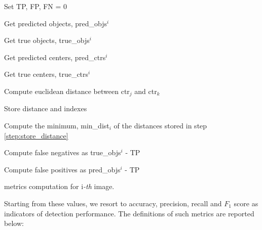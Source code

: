 \begin{algorithm}%
    \DontPrintSemicolon
    
    Set TP, FP, FN = 0
    
    Get predicted objects, pred\_objs$^i$
    
    Get true objects, true\_objs$^i$
    
    Get predicted centers, pred\_ctrs$^i$
    
    Get true centers, true\_ctrs$^i$
    
        {
            {
            
             Compute euclidean distance between ctr$_j$ and ctr$_k$ \label{step:ctrs_distance}
             
             Store distance and indexes
             \label{step:store_distance}
            } 
        
         Compute the minimum, min\_dist$_i$ of the distances stored in step \ref{step:store_distance}
         
        
        }
        
    Compute false negatives as true\_objs$^i$ - TP
    
    Compute false positives as pred\_objs$^i$ - TP
    
\caption{metrics computation for i\emph{-th} image.}
\label{algo:pseudocode_metrics}
\end{algorithm}
Starting from these values, we resort to accuracy, precision, recall and $F_1$ score as indicators of detection performance.
The definitions of such metrics are reported below:

